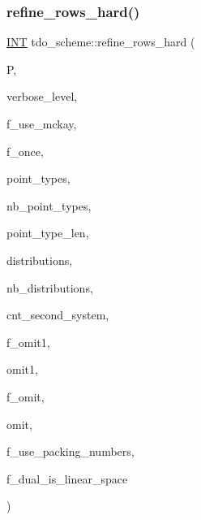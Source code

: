 \subsubsection{\texorpdfstring{refine\+\_\+rows\+\_\+hard()}{refine\_rows\_hard()}}
{\footnotesize\ttfamily \mbox{\hyperlink{galois_8h_a09fddde158a3a20bd2dcadb609de11dc}{I\+NT}} tdo\+\_\+scheme\+::refine\+\_\+rows\+\_\+hard (\begin{DoxyParamCaption}\item[{\mbox{\hyperlink{classpartitionstack}{partitionstack}} \&}]{P,  }\item[{int}]{verbose\+\_\+level,  }\item[{\mbox{\hyperlink{galois_8h_a09fddde158a3a20bd2dcadb609de11dc}{I\+NT}}}]{f\+\_\+use\+\_\+mckay,  }\item[{\mbox{\hyperlink{galois_8h_a09fddde158a3a20bd2dcadb609de11dc}{I\+NT}}}]{f\+\_\+once,  }\item[{\mbox{\hyperlink{galois_8h_a09fddde158a3a20bd2dcadb609de11dc}{I\+NT}} $\ast$\&}]{point\+\_\+types,  }\item[{\mbox{\hyperlink{galois_8h_a09fddde158a3a20bd2dcadb609de11dc}{I\+NT}} \&}]{nb\+\_\+point\+\_\+types,  }\item[{\mbox{\hyperlink{galois_8h_a09fddde158a3a20bd2dcadb609de11dc}{I\+NT}} \&}]{point\+\_\+type\+\_\+len,  }\item[{\mbox{\hyperlink{galois_8h_a09fddde158a3a20bd2dcadb609de11dc}{I\+NT}} $\ast$\&}]{distributions,  }\item[{\mbox{\hyperlink{galois_8h_a09fddde158a3a20bd2dcadb609de11dc}{I\+NT}} \&}]{nb\+\_\+distributions,  }\item[{\mbox{\hyperlink{galois_8h_a09fddde158a3a20bd2dcadb609de11dc}{I\+NT}} \&}]{cnt\+\_\+second\+\_\+system,  }\item[{\mbox{\hyperlink{galois_8h_a09fddde158a3a20bd2dcadb609de11dc}{I\+NT}}}]{f\+\_\+omit1,  }\item[{\mbox{\hyperlink{galois_8h_a09fddde158a3a20bd2dcadb609de11dc}{I\+NT}}}]{omit1,  }\item[{\mbox{\hyperlink{galois_8h_a09fddde158a3a20bd2dcadb609de11dc}{I\+NT}}}]{f\+\_\+omit,  }\item[{\mbox{\hyperlink{galois_8h_a09fddde158a3a20bd2dcadb609de11dc}{I\+NT}}}]{omit,  }\item[{\mbox{\hyperlink{galois_8h_a09fddde158a3a20bd2dcadb609de11dc}{I\+NT}}}]{f\+\_\+use\+\_\+packing\+\_\+numbers,  }\item[{\mbox{\hyperlink{galois_8h_a09fddde158a3a20bd2dcadb609de11dc}{I\+NT}}}]{f\+\_\+dual\+\_\+is\+\_\+linear\+\_\+space }\end{DoxyParamCaption})}

